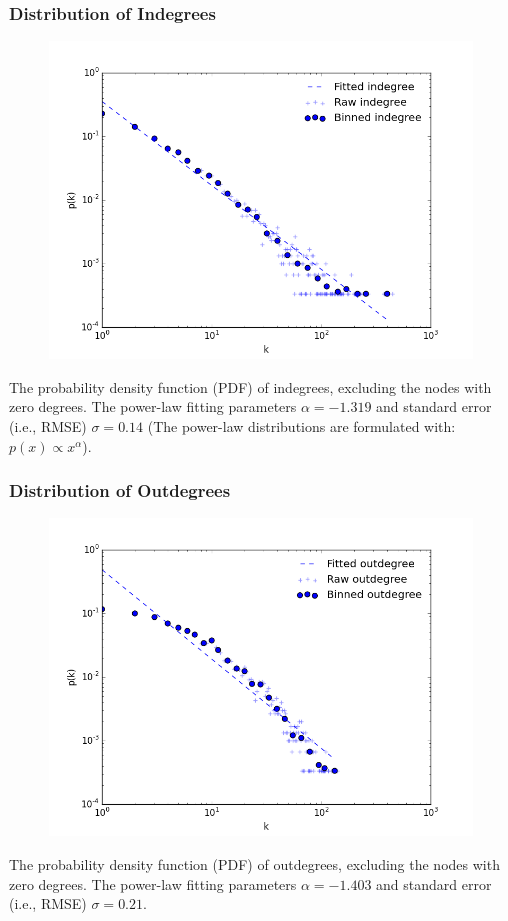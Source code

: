 \documentclass{beamer}
\begin{document}
\begin{frame}
\frametitle{Distribution of Indegrees}
\begin{figure}
\includegraphics[width=0.75\linewidth]{figs/indegree.png}
\end{figure}
\small{The probability density function (PDF) of indegrees, excluding the nodes with zero degrees. The power-law fitting parameters $\alpha=-1.319$ and standard error (i.e., RMSE) $\sigma= 0.14$ (The power-law distributions are formulated with: $p(x)\propto x^{\alpha}$).}
\end{frame}


\begin{frame}
\frametitle{Distribution of Outdegrees}
\begin{figure}
\includegraphics[width=0.8\linewidth]{figs/outdegree.png}
\end{figure}
\small{The probability density function (PDF) of outdegrees, excluding the nodes with zero degrees. The power-law fitting parameters $\alpha=-1.403$ and standard error (i.e., RMSE) $\sigma= 0.21$.}
\end{frame}
\end{document}
